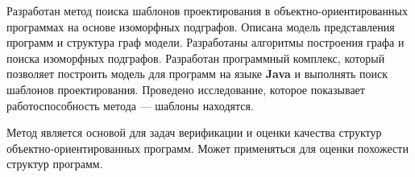 \Conclusion

Разработан метод поиска шаблонов проектирования в объектно-ориентированных
программах на основе изоморфных подграфов.
Описана модель представления программ и структура граф модели.
Разработаны алгоритмы построения графа и поиска изоморфных подграфов.
Разработан программный комплекс, который позволяет построить модель для
программ на языке \textbf{Java} и выполнять поиск шаблонов проектирования.
Проведено исследование, которое показывает работоспособность метода ---
шаблоны находятся.

Метод является основой для задач верификации и оценки качества
структур объектно-ориентированных программ.
Может применяться для оценки похожести структур программ.
